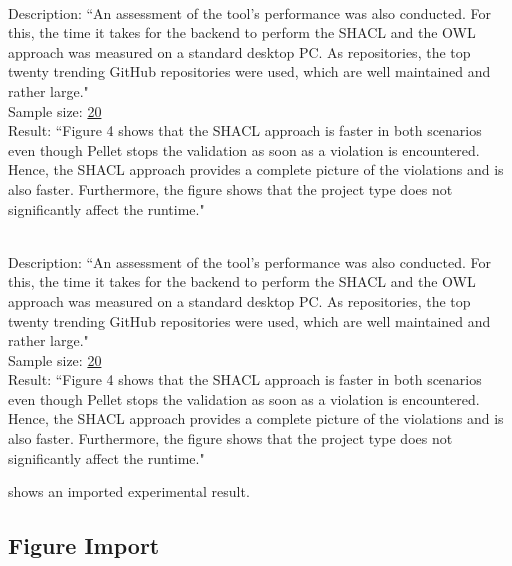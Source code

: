 \begin{expresult}\\
Description: ``An assessment of the tool’s performance was also conducted. For this, the time it takes for the backend to perform the SHACL and the OWL approach was measured on a standard desktop PC. As repositories, the top twenty trending GitHub repositories were used, which are well maintained and rather large."~\cite{martin2022specification}\\
Sample size: \url{20}\\
Result: ``Figure 4 shows that the SHACL approach is faster in both scenarios even though Pellet stops the validation as soon as a violation is encountered. Hence, the SHACL approach provides a complete picture of the violations and is also faster. Furthermore, the figure shows that the project type does not significantly affect the runtime."~\cite{martin2022specification}\\
\label{expresult:quare-performance18}
\end{expresult}
\begin{expresult}\\
Description: ``An assessment of the tool’s performance was also conducted. For this, the time it takes for the backend to perform the SHACL and the OWL approach was measured on a standard desktop PC. As repositories, the top twenty trending GitHub repositories were used, which are well maintained and rather large."~\cite{martin2022specification}\\
Sample size: \url{20}\\
Result: ``Figure 4 shows that the SHACL approach is faster in both scenarios even though Pellet stops the validation as soon as a violation is encountered. Hence, the SHACL approach provides a complete picture of the violations and is also faster. Furthermore, the figure shows that the project type does not significantly affect the runtime."~\cite{martin2022specification}\\
\label{expresult:quare-performance19}
\end{expresult}
 shows an imported experimental result.

\subsection{Figure Import}

